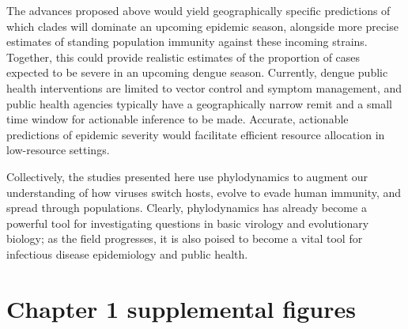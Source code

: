 The advances proposed above would yield geographically specific predictions of which clades will dominate an upcoming epidemic season, alongside more precise estimates of standing population immunity against these incoming strains.
Together, this could provide realistic estimates of the proportion of cases expected to be severe in an upcoming dengue season.
Currently, dengue public health interventions are limited to vector control and symptom management, and public health agencies typically have a geographically narrow remit and a small time window for actionable inference to be made.
Accurate, actionable predictions of epidemic severity would facilitate efficient resource allocation in low-resource settings.

Collectively, the studies presented here use phylodynamics to augment our understanding of how viruses switch hosts, evolve to evade human immunity, and spread through populations.
Clearly, phylodynamics has already become a powerful tool for investigating questions in basic virology and evolutionary biology; as the field progresses, it is also poised to become a vital tool for infectious disease epidemiology and public health.




\appendix
\raggedbottom\sloppy

\chapter{Chapter 1 supplemental figures}


